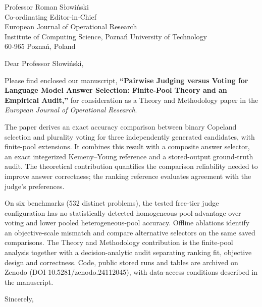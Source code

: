\documentclass[11pt]{letter}
\begin{document}
\begin{letter}{Professor Roman S{\l}owi{\'n}ski \\ Co-ordinating Editor-in-Chief \\ European Journal of Operational Research \\ Institute of Computing Science, Pozna{\'n} University of Technology \\ 60-965 Pozna{\'n}, Poland}

\opening{Dear Professor S{\l}owi{\'n}ski,}

Please find enclosed our manuscript, \textbf{``Pairwise Judging versus Voting for Language Model Answer Selection: Finite-Pool Theory and an Empirical Audit,''} for consideration as a Theory and Methodology paper in the \emph{European Journal of Operational Research}.

The paper derives an exact accuracy comparison between binary Copeland selection and plurality voting for three independently generated candidates, with finite-pool extensions. It combines this result with a composite answer selector, an exact integerized Kemeny--Young reference and a stored-output ground-truth audit. The theoretical contribution quantifies the comparison reliability needed to improve answer correctness; the ranking reference evaluates agreement with the judge's preferences.

On six benchmarks (532 distinct problems), the tested free-tier judge configuration has no statistically detected homogeneous-pool advantage over voting and lower pooled heterogeneous-pool accuracy. Offline ablations identify an objective-scale mismatch and compare alternative selectors on the same saved comparisons. The Theory and Methodology contribution is the finite-pool analysis together with a decision-analytic audit separating ranking fit, objective design and correctness. Code, public stored runs and tables are archived on Zenodo (DOI 10.5281/zenodo.24112045), with data-access conditions described in the manuscript.

\closing{Sincerely,}

\end{letter}
\end{document}
